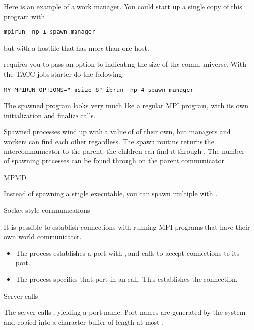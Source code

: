 Here is an example of a work manager.
%
%
%
You could start up a single copy of this program with 
\begin{verbatim}
mpirun -np 1 spawn_manager
\end{verbatim}
but with a hostfile that has more than one host.

\begin{taccnote}
 requires you to pass an option  to
 indicating the size of the comm universe. With the TACC
jobs starter  do the following:
\begin{verbatim}
MY_MPIRUN_OPTIONS="-usize 8" ibrun -np 4 spawn_manager
\end{verbatim}
\end{taccnote}
The spawned program looks very much like a regular MPI program, with
its own initialization and finalize calls.

%

Spawned processes wind up with a value of  of their
own, but managers and workers can find each other regardless.
The spawn routine returns the intercommunicator to the parent; the children
can find it through . The number of
spawning processes can be found through
 on the parent communicator.

 {MPMD}

Instead of spawning a single executable, you can spawn multiple with
.

 {Socket-style communications}

It is possible to establish connections with running MPI programs that
have their own world communicator.
\begin{itemize}
\item The  process establishes a port with 
  , and calls  to accept
  connections to its port.
\item The  process specifies that port 
  in an  call. This establishes the connection.
\end{itemize}

 {Server calls}

The server calls , yielding a port name.
Port names are generated by the system and copied into a character
buffer of length at most .

